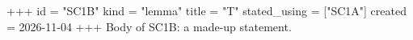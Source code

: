 +++
id = "SC1B"
kind = "lemma"
title = "T"
stated_using = ["SC1A"]
created = 2026-11-04
+++
Body of SC1B: a made-up statement.
